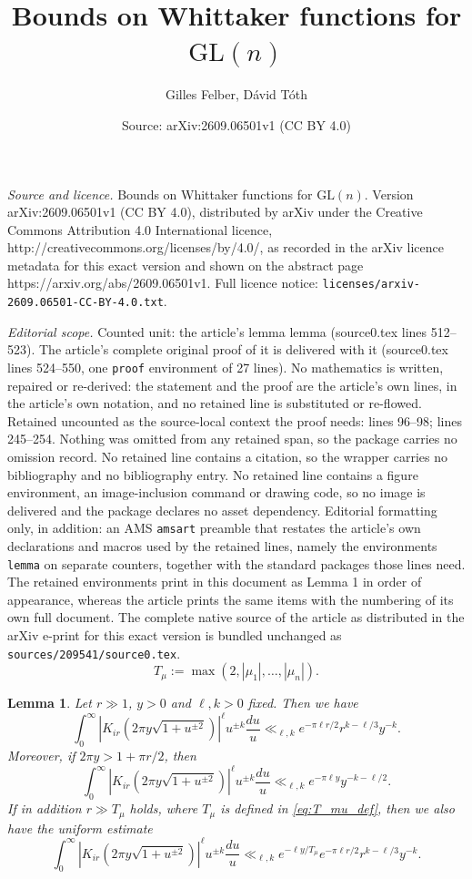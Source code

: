 \documentclass[10pt,a4paper]{amsart}
\title{Bounds on Whittaker functions for $\mathrm{GL}(n)$}
\author{Gilles Felber, D\'avid T\'oth}
\date{Source: arXiv:2609.06501v1 (CC BY 4.0)}
\newtheorem{lemma}{Lemma}
\newcommand{\abs}[1]{\left|#1\right|}
\begin{document}
\maketitle

\noindent\emph{Source and licence.} Bounds on Whittaker functions for $\mathrm{GL}(n)$. Version arXiv:2609.06501v1 (CC BY 4.0), distributed by arXiv under the Creative Commons Attribution 4.0 International licence, http://creativecommons.org/licenses/by/4.0/, as recorded in the arXiv licence metadata for this exact version and shown on the abstract page https://arxiv.org/abs/2609.06501v1. Full licence notice: \texttt{licenses/arxiv-2609.06501-CC-BY-4.0.txt}.\par\smallskip

\noindent\textit{Editorial scope.} Counted unit: the article's lemma lemma (source0.tex lines 512--523). The article's complete original proof of it is delivered with it (source0.tex lines 524--550, one \texttt{proof} environment of 27 lines). No mathematics is written, repaired or re-derived: the statement and the proof are the article's own lines, in the article's own notation, and no retained line is substituted or re-flowed.  Retained uncounted as the source-local context the proof needs: lines 96--98; lines 245--254.  Nothing was omitted from any retained span, so the package carries no omission record.  No retained line contains a citation, so the wrapper carries no bibliography and no bibliography entry.  No retained line contains a figure environment, an image-inclusion command or drawing code, so no image is delivered and the package declares no asset dependency.  Editorial formatting only, in addition: an AMS \texttt{amsart} preamble that restates the article's own declarations and macros used by the retained lines, namely the environments \texttt{lemma} on separate counters, together with the standard packages those lines need.  The retained environments print in this document as Lemma 1 in order of appearance, whereas the article prints the same items with the numbering of its own full document.  The complete native source of the article as distributed in the arXiv e-print for this exact version is bundled unchanged as \texttt{sources/209541/source0.tex}.
\begin{equation}\label{eq:T_mu_def}
T_\mu:=\max(2,|\mu_1|,\dots,|\mu_n|).
\end{equation}

\begin{lemma}\label{lem bound integral of Bessel function}
Let $r\gg1$, $y>0$ and $\ell,k>0$ fixed.
Then we have
$$\int_0^\infty\abs{K_{ir}(2\pi y\sqrt{1+u^{\pm 2}})}^\ell u^{\pm k}\frac{du}u\ll_{\ell,k}e^{-\pi\ell r/2}r^{k-\ell/3}y^{-k}.$$
Moreover, if $2\pi y>1+\pi r/2$, then
$$\int_0^\infty\abs{K_{ir}(2\pi y\sqrt{1+u^{\pm 2}})}^\ell u^{\pm k}\frac{du}u\ll_{\ell,k}e^{-\pi\ell y}y^{-k-\ell/2}.$$
If in addition $r\gg T_\mu$ holds, where $T_\mu$ is defined in \eqref{eq:T_mu_def},
then we also have the uniform estimate
$$\int_0^\infty\abs{K_{ir}(2\pi y\sqrt{1+u^{\pm 2}})}^\ell u^{\pm k}\frac{du}u\ll_{\ell,k}e^{-\ell y/T_\mu}e^{-\pi\ell r/2}r^{k-\ell/3}y^{-k}.$$
\end{lemma}
\end{document}
